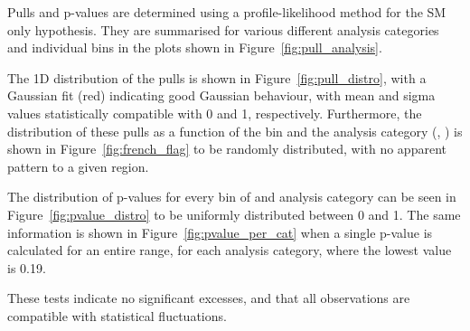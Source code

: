 
Pulls and p-values are determined using a profile-likelihood method for the
SM only hypothesis. They are
summarised for various different analysis categories and individual \HT bins
in the plots shown in Figure~\ref{fig:pull_analysis}.

The 1D distribution of the
pulls is shown in Figure~\ref{fig:pull_distro}, with a Gaussian fit (red)
indicating good Gaussian behaviour, with mean and sigma values statistically
compatible with 0 and 1, respectively. Furthermore, the distribution of
these pulls as a function of the \HT bin and
the analysis category (\nb, \nj) is shown in Figure~\ref{fig:french_flag} to be
randomly distributed, with no apparent pattern to a given region.

The distribution of p-values for every bin of \HT and analysis category can be
seen in Figure~\ref{fig:pvalue_distro} to be uniformly distributed between 0
and 1. The same information is shown in Figure~\ref{fig:pvalue_per_cat} when a
single p-value is calculated for an entire \HT range, for each analysis
category, where the lowest value is 0.19.

These tests indicate no significant excesses, and that all observations are
compatible with statistical fluctuations.




